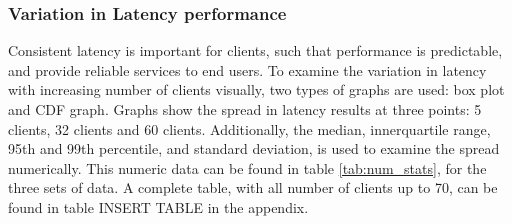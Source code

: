 \subsubsection{Variation in Latency performance}
Consistent latency is important for clients, such that performance is predictable, and provide reliable services to end users.
To examine the variation in latency with increasing number of clients visually, two types of graphs are used: box plot and CDF graph.
Graphs show the spread in latency results at three points: 5 clients, 32 clients and 60 clients.
Additionally, the median, innerquartile range, 95th and 99th percentile, and standard deviation, is used to examine the spread numerically.
This numeric data can be found in table \ref{tab:num_stats}, for the three sets of data.
A complete table, with all number of clients up to 70, can be found in table INSERT TABLE in the appendix.
